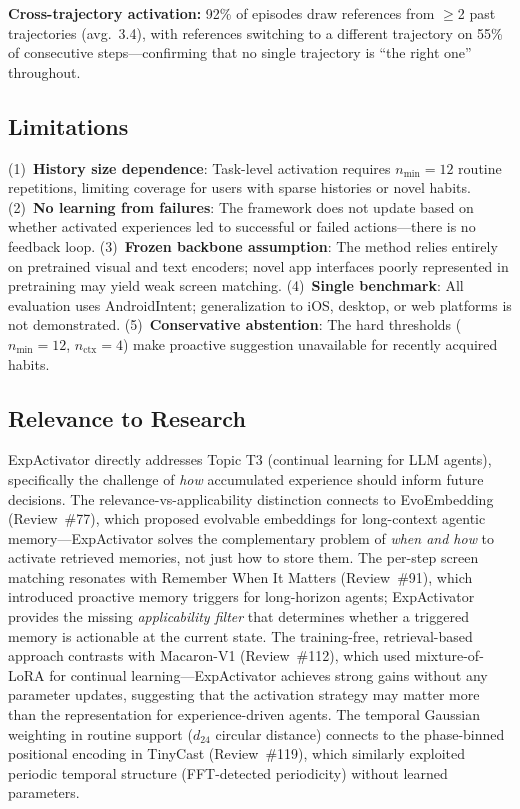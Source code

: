 \documentclass[11pt,a4paper]{article}
\begin{document}
\textbf{Cross-trajectory activation:} 92\% of episodes draw references from $\geq$2 past trajectories (avg.\ 3.4), with references switching to a different trajectory on 55\% of consecutive steps---confirming that no single trajectory is ``the right one'' throughout.

\subsection{Limitations}
(1)~\textbf{History size dependence}: Task-level activation requires $n_{\min}{=}12$ routine repetitions, limiting coverage for users with sparse histories or novel habits. (2)~\textbf{No learning from failures}: The framework does not update based on whether activated experiences led to successful or failed actions---there is no feedback loop. (3)~\textbf{Frozen backbone assumption}: The method relies entirely on pretrained visual and text encoders; novel app interfaces poorly represented in pretraining may yield weak screen matching. (4)~\textbf{Single benchmark}: All evaluation uses AndroidIntent; generalization to iOS, desktop, or web platforms is not demonstrated. (5)~\textbf{Conservative abstention}: The hard thresholds ($n_{\min}{=}12$, $n_{\text{ctx}}{=}4$) make proactive suggestion unavailable for recently acquired habits.

\subsection{Relevance to Research}
ExpActivator directly addresses Topic T3 (continual learning for LLM agents), specifically the challenge of \emph{how} accumulated experience should inform future decisions. The relevance-vs-applicability distinction connects to EvoEmbedding (Review~\#77), which proposed evolvable embeddings for long-context agentic memory---ExpActivator solves the complementary problem of \emph{when and how} to activate retrieved memories, not just how to store them. The per-step screen matching resonates with Remember When It Matters (Review~\#91), which introduced proactive memory triggers for long-horizon agents; ExpActivator provides the missing \emph{applicability filter} that determines whether a triggered memory is actionable at the current state. The training-free, retrieval-based approach contrasts with Macaron-V1 (Review~\#112), which used mixture-of-LoRA for continual learning---ExpActivator achieves strong gains without any parameter updates, suggesting that the activation strategy may matter more than the representation for experience-driven agents. The temporal Gaussian weighting in routine support ($d_{24}$ circular distance) connects to the phase-binned positional encoding in TinyCast (Review~\#119), which similarly exploited periodic temporal structure (FFT-detected periodicity) without learned parameters.
\end{document}

